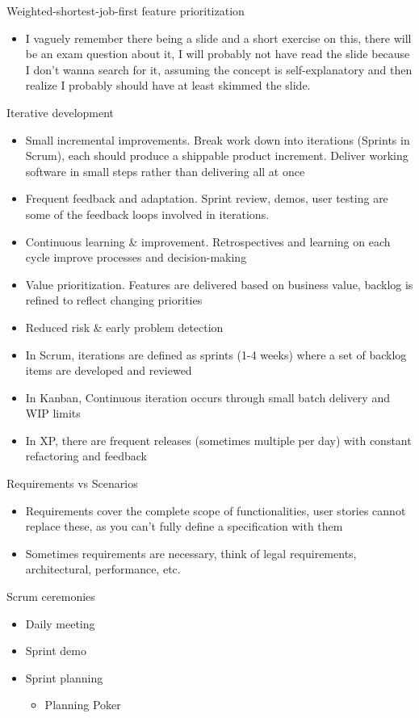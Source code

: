 \documentclass[10pt]{article}
\begin{document}
Weighted-shortest-job-first feature prioritization
\begin{itemize}
\item I vaguely remember there being a slide and a short exercise on this, there will be an exam question about it, I will probably not have read the slide because I don't wanna search for it, assuming the concept is self-explanatory and then realize I probably should have at least skimmed the slide.
\end{itemize}
Iterative development
\begin{itemize}
\item Small incremental improvements. Break work down into iterations (Sprints in Scrum), each should produce a shippable product increment. Deliver working software in small steps rather than delivering all at once
\item Frequent feedback and adaptation. Sprint review, demos, user testing are some of the feedback loops involved in iterations.
\item Continuous learning \& improvement. Retrospectives and learning on each cycle improve processes and decision-making
\item Value prioritization. Features are delivered based on business value, backlog is refined to reflect changing priorities
\item Reduced risk \& early problem detection
\end{itemize}
\begin{itemize}
\item In Scrum, iterations are defined as sprints (1-4 weeks) where a set of backlog items are developed and reviewed
\item In Kanban, Continuous iteration occurs through small batch delivery and WIP limits
\item In XP, there are frequent releases (sometimes multiple per day) with constant refactoring and feedback
\end{itemize}
Requirements vs Scenarios
\begin{itemize}
\item Requirements cover the complete scope of functionalities, user stories cannot replace these, as you can't fully define a specification with them
\item Sometimes requirements are necessary, think of legal requirements, architectural, performance, etc.
\end{itemize}
Scrum ceremonies
\begin{itemize}
\item Daily meeting
\item Sprint demo
\item Sprint planning
\begin{itemize}
\item Planning Poker
\end{itemize}
\end{itemize}
\end{document}
